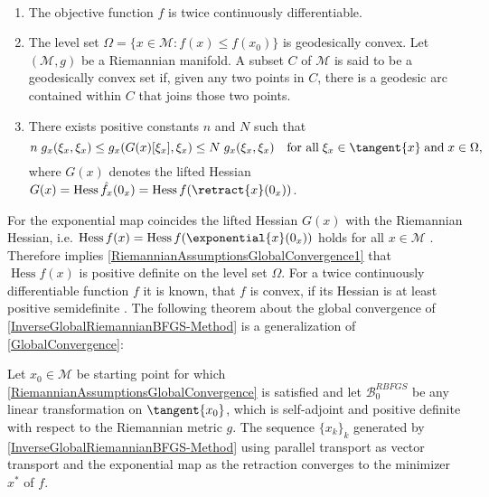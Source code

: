 \begin{assumption}[{\cite[Assumptions~2.4.2.]{Qi:2011}}]\label{RiemannianAssumptionsGlobalConvergence} \ \\[-1.5\baselineskip]
    \begin{enumerate}
        \item The objective function $f$ is twice continuously differentiable.
        \item The level set $\Omega = \{ x \in  \mathcal{M}: f(x) \leq f(x_0) \}$ is geodesically convex. Let $(\mathcal{M}, g)$ be a Riemannian manifold. A subset $C$ of $\mathcal{M}$ is said to be a geodesically convex set if, given any two points in $C$, there is a geodesic arc contained within $C$ that joins those two points.
        \item There exists positive constants $n$ and $N$ such that \begin{equation*} n \; g_x(\xi_x, \xi_x) \leq g_x(G(x)[\xi_x],\xi_x) \leq N \; g_x (\xi_x,\xi_x) \quad \text{for all} \; \xi_x \in \tangent{x} \; \text{and} \; x \in \Omega, \end{equation*} where $G(x)$ denotes the lifted Hessian $G(x) = \operatorname{Hess} \hat{f_x} (0_x) = \operatorname{Hess} f(\retract{x}(0_x))$. \label{RiemannianAssumptionsGlobalConvergence1}
    \end{enumerate}
\end{assumption}

For the exponential map coincides the lifted Hessian $G(x)$ with the Riemannian Hessian, i.e. $\operatorname{Hess} f(x) = \operatorname{Hess} f(\exponential{x}(0_x))$ holds for all $x \in \mathcal{M}$ \cite[p.~106]{AbsilMahonySepulchre:2008}. Therefore implies \cref{RiemannianAssumptionsGlobalConvergence1} that $\operatorname{Hess} f(x)$ is positive definite on the level set $\Omega$. For a twice continuously differentiable function $f$ it is known, that $f$ is convex, if its Hessian is at least positive semidefinite \cite[p.~5]{NetoMeloSousa:2017}. The following theorem about the global convergence of \cref{InverseGlobalRiemannianBFGS-Method} is a generalization of \cref{GlobalConvergence}: 

\begin{theorem}[{\cite[Theorem~2.4.3.]{Qi:2011}}] \label{RiemannianGlobalConvergence}
    Let $x_0 \in \mathcal{M}$ be starting point for which \cref{RiemannianAssumptionsGlobalConvergence} is satisfied and let $\mathcal{B}^{RBFGS}_{0}$ be any linear transformation on $\tangent{x_0}$, which is self-adjoint and positive definite with respect to the Riemannian metric $g$. The sequence $\{ x_k \}_k$ generated by \cref{InverseGlobalRiemannianBFGS-Method} using parallel transport as vector transport and the exponential map as the retraction converges to the minimizer $x^*$ of $f$.
\end{theorem}

